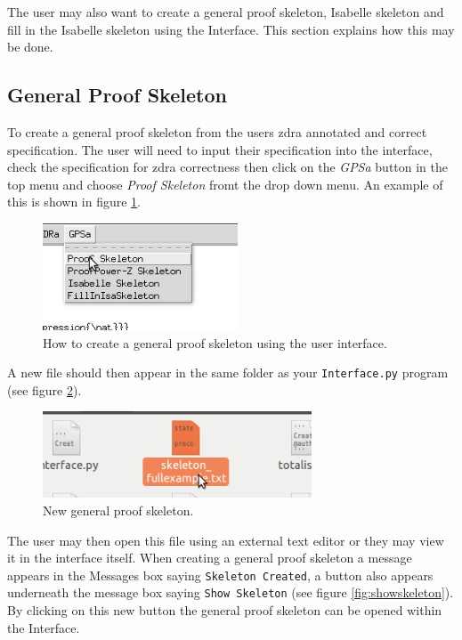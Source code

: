 The user may also want to create a general proof skeleton, Isabelle skeleton and
fill in the Isabelle skeleton using the Interface. This section explains how
this may be done.

\subsection{General Proof Skeleton}

To create a general proof skeleton from the users \gls{zdra} annotated and
correct specification. The user will need to input their specification into the
interface, check the specification for \gls{zdra} correctness then click on the
\emph{GPSa} button in the top menu and choose \emph{Proof Skeleton} fromt the
drop down menu. An example of this is shown in figure \ref{fig:gpsabutton}.

\begin{figure}[H]
\centering
\includegraphics[scale=0.5]{Figures/Interface/proofskeleton.png}
\caption{How to create a general proof skeleton using the user interface. \label{fig:gpsabutton}}
\end{figure}

A new file should then appear in the same folder as your \texttt{Interface.py}
program (see figure \ref{fig:gpsadoc}).

\begin{figure}[H]
\centering
\includegraphics[scale=0.5]{Figures/Interface/skeletondoc.png}
\caption{New general proof skeleton. \label{fig:gpsadoc}}
\end{figure}

The user may then open this file using an external text editor or they may view
it in the interface itself. When creating a general proof skeleton a message
appears in the Messages box saying \texttt{Skeleton Created}, a button also
appears underneath the message box saying \texttt{Show Skeleton} (see figure
\ref{fig:showskeleton}). By clicking on this new button the general proof
skeleton can be opened within the Interface. 

